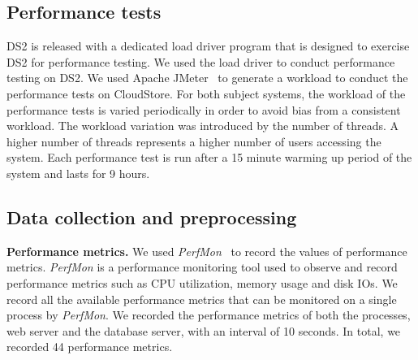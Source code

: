 \subsection{Performance tests}

DS2 is released with a dedicated load driver program that is designed to exercise DS2 for performance testing. We used the load driver to conduct performance testing on DS2. We used Apache JMeter~\cite{apachejmeter} to generate a workload to conduct the performance tests on CloudStore. For both subject systems, the workload of the performance tests is varied periodically in order to avoid bias from a consistent workload. The workload variation was introduced by the number of threads. A higher number of threads represents a higher number of users accessing the system. Each performance test is run after a 15 minute warming up period of the system and lasts for 9 hours. 





\subsection{Data collection and preprocessing}

\noindent \textbf{Performance metrics.} We used \textit{PerfMon}~\cite{perfmon} to record the values of performance metrics. \textit{PerfMon} is a performance monitoring tool used to observe and record performance metrics such as CPU utilization, memory usage and disk IOs. We record all the available performance metrics that can be monitored on a single process by \emph{PerfMon}.  We recorded the performance metrics of both the processes, web server and the database server, with an interval of 10 seconds. In total, we recorded 44 performance metrics. 

